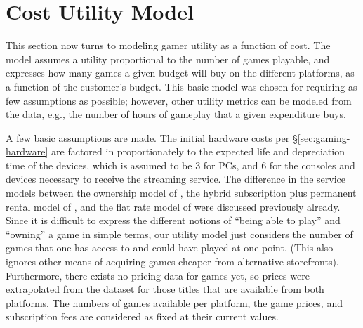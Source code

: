 \section{Cost Utility Model}
\label{sec:utilitymodel}

This section now turns to modeling gamer utility as a function
of cost. The model assumes a utility proportional to the number
of games playable, and expresses how many games a given budget will
buy on the different platforms, as a function of the customer's
budget. This basic model was chosen for requiring as few assumptions
as possible;
however, other utility metrics can be modeled from the data,
e.g., the number of hours of gameplay that a given expenditure buys.

A few basic assumptions are made. The initial hardware costs
per §\ref{sec:gaming-hardware} are
factored in proportionately to the expected life and depreciation time
of the devices, which is assumed to be \SI{3}{\year} for PCs, and
\SI{6}{\year} for the consoles and devices necessary to receive the
streaming service.
The difference in the service models between the ownership model of
\steam, the hybrid subscription plus permanent rental model of \gfnow,
and the flat rate model of \psnow were discussed previously already.
Since it is difficult to express the different notions of ``being able
to play'' and ``owning'' a game in simple terms, our utility model just
considers the number of games that one has access to and could have
played at one point. (This also ignores other means of acquiring
games cheaper from alternative storefronts).
Furthermore, there exists no pricing data for \gfnow games yet,
so prices were extrapolated from the \steam dataset for those
titles that are available from both platforms.
The numbers of games available per platform, the game prices,
and subscription fees are considered as fixed at their current values.


